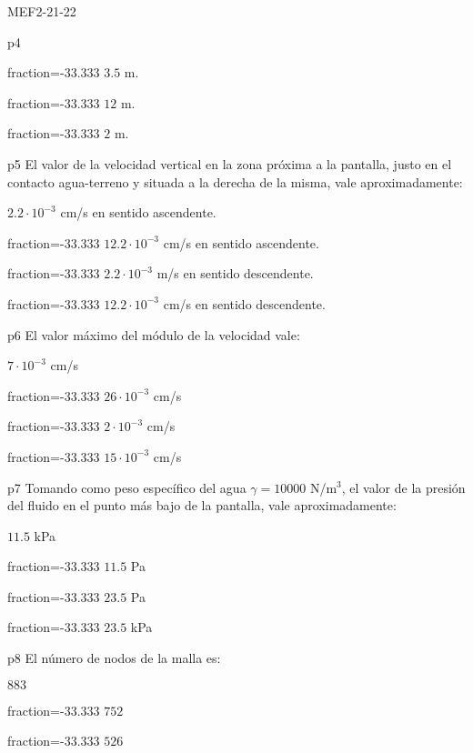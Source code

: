 \documentclass[a4paper]{article}
\begin{document}
\begin{quiz}{MEF2-21-22}
\begin{multi}{p4}
	\item[fraction=-33.333] $3.5$ m.
	\item[fraction=-33.333] $12$ m.
	\item[fraction=-33.333] $2$ m.
\end{multi}
\begin{multi}{p5}
	El valor de la velocidad vertical en la zona pr\'oxima a la pantalla, justo en el contacto agua-terreno y situada a la derecha de la misma, vale aproximadamente:
	\item* $2.2 \cdot 10^{-3}$ cm/s en sentido ascendente.
	\item[fraction=-33.333] $12.2 \cdot 10^{-3}$ cm/s en sentido ascendente.
	\item[fraction=-33.333] $2.2 \cdot 10^{-3}$ m/s en sentido descendente.
	\item[fraction=-33.333] $12.2 \cdot 10^{-3}$ cm/s en sentido descendente.
\end{multi}
\begin{multi}{p6}
El valor m\'aximo del m\'odulo de la velocidad vale:
\item*  $7 \cdot 10^{-3}$ cm/s
\item[fraction=-33.333] $26 \cdot 10^{-3}$ cm/s
\item[fraction=-33.333] $2 \cdot 10^{-3}$ cm/s
\item[fraction=-33.333] $15 \cdot 10^{-3}$ cm/s
\end{multi}
\begin{multi}{p7}
	Tomando como peso espec\'ifico del agua $\gamma=10000$ N/m$^3$, el valor de la presi\'on
	del fluido en el punto m\'as bajo de la pantalla, vale aproximadamente:
	\item* $11.5$ kPa
	\item[fraction=-33.333] $11.5$ Pa
	\item[fraction=-33.333] $23.5$ Pa
	\item[fraction=-33.333] $23.5$ kPa
\end{multi}
\begin{multi}{p8}
	El n\'umero de nodos de la malla es:
	\item* $883$
	\item[fraction=-33.333] $752$
	\item[fraction=-33.333] $526$

\end{multi}
\end{quiz}
\end{document}
